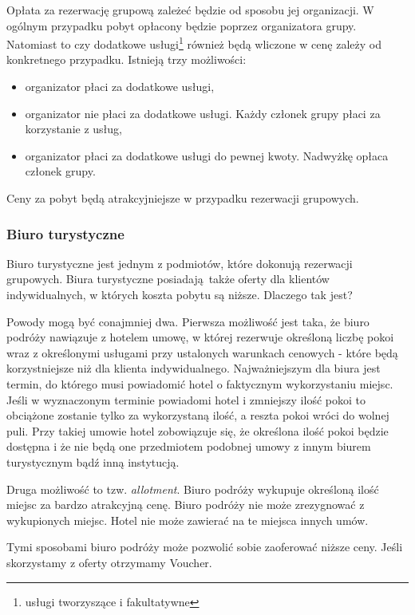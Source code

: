 \documentclass[a4paper,onecolumn,oneside,11pt,wide,floatssmall]{mwrep}
\theoremstyle{definition}
\theoremstyle{plain}%
\theoremstyle{remark}
\begin{document}
Opłata za rezerwację grupową zależeć będzie od sposobu jej organizacji. W 
ogólnym przypadku pobyt opłacony będzie poprzez organizatora grupy. 
Natomiast to czy dodatkowe usługi\footnote{usługi tworzyszące i fakultatywne}
 również będą wliczone w cenę zależy od konkretnego przypadku. Istnieją trzy 
 możliwości:

\begin{itemize}
   \item organizator płaci za dodatkowe usługi,
   \item organizator nie płaci za dodatkowe usługi. Każdy członek grupy 
   płaci za korzystanie z usług,
   \item organizator płaci za dodatkowe usługi do pewnej kwoty. Nadwyżkę 
   opłaca członek grupy.
\end{itemize}

Ceny za pobyt będą atrakcyjniejsze w przypadku rezerwacji grupowych.

\subsubsection{Biuro turystyczne}
\label{biuro-turystyczne}
Biuro turystyczne jest jednym z podmiotów, które dokonują rezerwacji 
grupowych. Biura turystyczne posiadają także oferty dla klientów 
indywidualnych, w których koszta pobytu są niższe. Dlaczego tak jest?

Powody mogą być conajmniej dwa. Pierwsza możliwość jest taka, że biuro 
podróży nawiązuje z hotelem umowę, w której rezerwuje określoną liczbę 
pokoi wraz z określonymi usługami przy ustalonych warunkach cenowych - 
które będą korzystniejsze niż dla klienta indywidualnego. Najważniejszym dla 
biura jest termin, do którego musi powiadomić hotel o faktycznym 
wykorzystaniu miejsc. Jeśli w wyznaczonym terminie powiadomi hotel i 
zmniejszy ilość pokoi to obciążone zostanie tylko za wykorzystaną ilość, a 
reszta pokoi wróci do wolnej puli. Przy takiej umowie hotel zobowiązuje się, 
że określona ilość pokoi będzie dostępna i że nie będą one przedmiotem 
podobnej umowy z innym biurem turystycznym bądź inną instytucją.

Druga możliwość to tzw. \emph{allotment}. Biuro podróży wykupuje określoną 
ilość 
miejsc za bardzo atrakcyjną cenę. Biuro podróży nie może zrezygnować z 
wykupionych miejsc. Hotel nie może zawierać na te miejsca innych umów.

Tymi sposobami biuro podróży może pozwolić sobie zaoferować niższe ceny. 
Jeśli skorzystamy z oferty otrzymamy Voucher.
\end{document}
